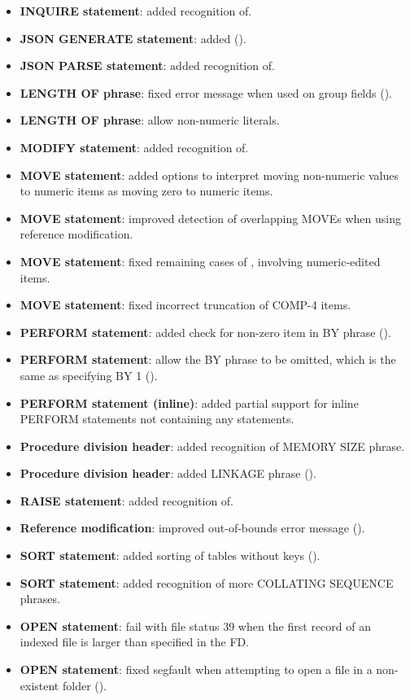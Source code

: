 \begin{itemize}
\item \textbf{INQUIRE statement}: added recognition of.
\item \textbf{JSON GENERATE statement}: added ().
\item \textbf{JSON PARSE statement}: added recognition of.
\item \textbf{LENGTH OF phrase}: fixed error message when used on group fields ().
\item \textbf{LENGTH OF phrase}: allow non-numeric literals.
\item \textbf{MODIFY statement}: added recognition of.
\item \textbf{MOVE statement}: added options to interpret moving non-numeric values to numeric items as moving zero to numeric items.
\item \textbf{MOVE statement}: improved detection of overlapping MOVEs when using reference modification.
\item \textbf{MOVE statement}: fixed remaining cases of , involving numeric-edited items.
\item \textbf{MOVE statement}: fixed incorrect truncation of COMP-4 items.
\item \textbf{PERFORM statement}: added check for non-zero item in BY phrase ().
\item \textbf{PERFORM statement}: allow the BY phrase to be omitted, which is the same as specifying BY 1 ().
\item \textbf{PERFORM statement (inline)}: added partial support for inline PERFORM statements not containing any statements.
\item \textbf{Procedure division header}: added recognition of MEMORY SIZE phrase.
\item \textbf{Procedure division header}: added LINKAGE phrase ().
\item \textbf{RAISE statement}: added recognition of.
\item \textbf{Reference modification}: improved out-of-bounds error message ().
\item \textbf{SORT statement}: added sorting of tables without keys ().
\item \textbf{SORT statement}: added recognition of more COLLATING SEQUENCE phrases.
\item \textbf{OPEN statement}: fail with file status 39 when the first record of an indexed file is larger than specified in the FD.
\item \textbf{OPEN statement}: fixed segfault when attempting to open a file in a non-existent folder ().

\end{itemize}
